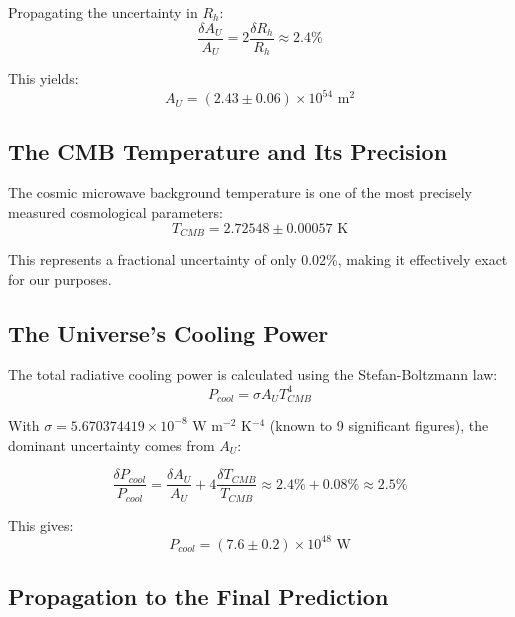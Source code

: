 \documentclass[11pt,a4paper]{article}
\theoremstyle{definition}
\theoremstyle{remark}
\begin{document}
Propagating the uncertainty in \(R_h\):
\begin{equation}
    \frac{\delta A_U}{A_U} = 2 \frac{\delta R_h}{R_h} \approx 2.4\%
\end{equation}

This yields:
\begin{equation}
    A_U = (2.43 \pm 0.06) \times 10^{54} \text{ m}^2
\end{equation}

\subsection{The CMB Temperature and Its Precision}

The cosmic microwave background temperature is one of the most precisely measured cosmological parameters:
\begin{equation}
    T_{CMB} = 2.72548 \pm 0.00057 \text{ K}
\end{equation}

This represents a fractional uncertainty of only 0.02\%, making it effectively exact for our purposes.

\subsection{The Universe's Cooling Power}

The total radiative cooling power is calculated using the Stefan-Boltzmann law:
\begin{equation}
    P_{cool} = \sigma A_U T_{CMB}^4
\end{equation}

With \(\sigma = 5.670374419 \times 10^{-8}\) W m\(^{-2}\) K\(^{-4}\) (known to 9 significant figures), the dominant uncertainty comes from \(A_U\):

\begin{equation}
    \frac{\delta P_{cool}}{P_{cool}} = \frac{\delta A_U}{A_U} + 4\frac{\delta T_{CMB}}{T_{CMB}} \approx 2.4\% + 0.08\% \approx 2.5\%
\end{equation}

This gives:
\begin{equation}
    P_{cool} = (7.6 \pm 0.2) \times 10^{48} \text{ W}
\end{equation}

\subsection{Propagation to the Final Prediction}
\end{document}
